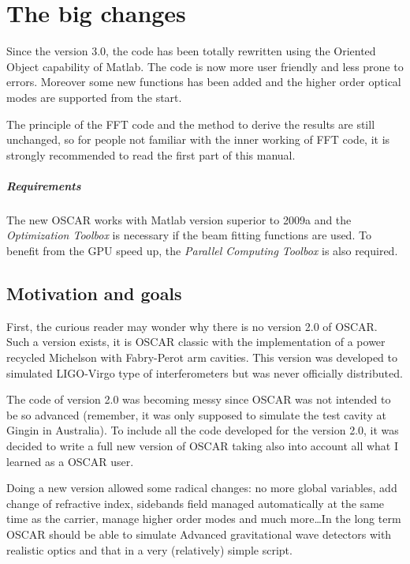 

\chapter{The big changes}

Since the version 3.0, the code has been totally rewritten using the Oriented Object capability of Matlab. The code is now more user friendly and less prone to errors. Moreover some new functions has been added and the higher order optical modes are supported from the start.

The principle of the FFT code and the method to derive the results are still unchanged, so for people not familiar with the inner working of FFT code, it is strongly recommended to read the first part of this manual.

\paragraph{Requirements} The new OSCAR works with Matlab version superior to 2009a and the \textsl{Optimization Toolbox} is necessary if the beam fitting functions are used. To benefit from the GPU speed up, the \textsl{Parallel Computing Toolbox} is also required. 

\section{Motivation and goals}

 First, the curious reader may wonder why there is no version 2.0 of OSCAR. Such a version exists, it is OSCAR classic with the implementation of a power recycled Michelson with Fabry-Perot arm cavities. This version was developed to simulated LIGO-Virgo type of interferometers but was never officially distributed.

 The code of version 2.0 was becoming messy since OSCAR was not intended to be so advanced (remember, it was only supposed to simulate the test cavity at Gingin in Australia). To include all the code developed for the version 2.0, it was decided to write a full new version of OSCAR taking also into account all what I learned as a OSCAR user.

 Doing a new version allowed some radical changes: no more global variables, add change of refractive index, sidebands field managed automatically at the same time as the carrier, manage higher order modes and much more\dots In the long term OSCAR should be able to simulate Advanced gravitational wave detectors with realistic optics and that in a very (relatively) simple script.

